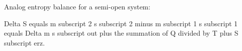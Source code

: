 Analog entropy balance for a semi-open system:  

Delta S equals m subscript 2 s subscript 2 minus m subscript 1 s subscript 1 equals Delta m s subscript out plus the summation of Q divided by T plus S subscript erz.